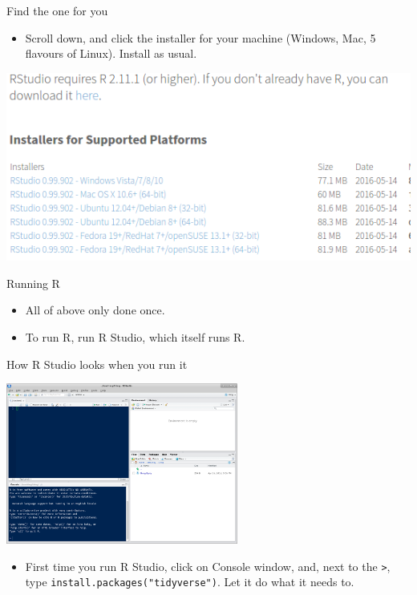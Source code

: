 \documentclass[ignorenonframetext,]{beamer}
\providecommand{\tightlist}{%
  \setlength{\itemsep}{0pt}\setlength{\parskip}{0pt}}
\begin{document}
\begin{frame}{Find the one for you}
\protect\hypertarget{find-the-one-for-you}{}

\begin{itemize}
\tightlist
\item
  Scroll down, and click the installer for your machine (Windows, Mac, 5
  flavours of Linux). Install as usual.
\end{itemize}

\includegraphics{rr40.png}

\end{frame}

\begin{frame}{Running R}
\protect\hypertarget{running-r-1}{}

\begin{itemize}
\tightlist
\item
  All of above only done once.
\item
  To run R, run R Studio, which itself runs R.
\end{itemize}

\end{frame}

\begin{frame}[fragile]{How R Studio looks when you run it}
\protect\hypertarget{how-r-studio-looks-when-you-run-it}{}

\includegraphics[width=\textwidth,height=2.08333in]{rstudio-startup.png}

\begin{itemize}
\tightlist
\item
  First time you run R Studio, click on Console window, and, next to the
  \texttt{\textgreater{}}, type \texttt{install.packages("tidyverse")}.
  Let it do what it needs to.
\end{itemize}

\end{frame}
\end{document}
